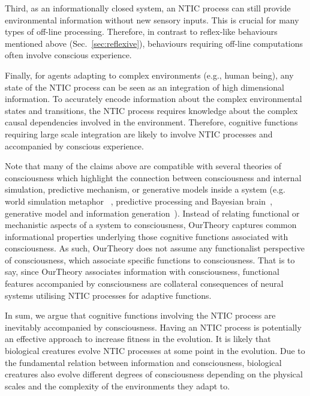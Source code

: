 \documentclass[utf8]{article}
\begin{document}
    	    Third, as an informationally closed system, an NTIC process can still provide environmental information without new sensory inputs. This is crucial for many types of off-line processing. Therefore, in contrast to reflex-like behaviours mentioned above (Sec.~\ref{sec:reflexive}), behaviours requiring off-line computations \citep{milner1999paradoxical, himmelbach2005dorsal,revol2003pointing} often involve conscious experience. 
    	    
    	    Finally, for agents adapting to complex environments (e.g., human being), any state of the NTIC process can be seen as an integration of high dimensional information. To accurately encode information about the complex environmental states and transitions, the NTIC process requires knowledge about the complex causal dependencies involved in the environment. Therefore, cognitive functions requiring large scale integration are likely to involve NTIC processes and accompanied by conscious experience. %
    	    
    	    Note that many of the claims above are compatible with several theories of consciousness which highlight the connection between consciousness and internal simulation, predictive mechanism, or generative models inside a system (e.g. world simulation metaphor ~\citep{revonsuo2006inner}, predictive processing and Bayesian brain~\citep{clark_2013,Hohwy2013,SethPP2014}, generative model and information generation~\citep{kanai_chang_yu_de_abril_biehl_guttenberg_2019}). Instead of relating functional or mechanistic aspects of a system to consciousness, \ac{OurTheory} captures common informational properties underlying those cognitive functions associated with consciousness. As such, \ac{OurTheory} does not assume any functionalist perspective of consciousness, which associate specific functions to consciousness.  That is to say, since \ac{OurTheory} associates information  with consciousness, functional features accompanied by consciousness are collateral consequences of neural systems utilising NTIC processes for adaptive functions. 
    	    
    	    In sum, we argue that cognitive functions involving the NTIC process are inevitably accompanied by consciousness. Having an NTIC process is potentially an effective approach to increase fitness in the evolution. It is likely that biological creatures evolve NTIC processes at some point in the evolution. Due to the fundamental relation between information and consciousness, biological creatures also evolve different degrees of consciousness depending on the physical scales and the complexity of the environments they adapt to. 
    	    
\end{document}
